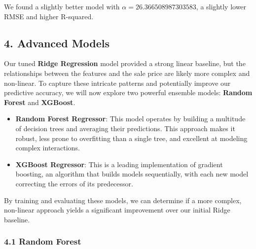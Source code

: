 \documentclass[11pt]{article}
\begin{document}
    We found a slightly better model with \(\alpha=26.366508987303583\), a
slightly lower RMSE and higher R-squared.

    \subsection{4. Advanced Models}\label{advanced-models}

    Our tuned \textbf{Ridge Regression} model provided a strong linear
baseline, but the relationships between the features and the sale price
are likely more complex and non-linear. To capture these intricate
patterns and potentially improve our predictive accuracy, we will now
explore two powerful ensemble models: \textbf{Random Forest} and
\textbf{XGBoost}.

\begin{itemize}
\item
  \textbf{Random Forest Regressor}: This model operates by building a
  multitude of decision trees and averaging their predictions. This
  approach makes it robust, less prone to overfitting than a single
  tree, and excellent at modeling complex interactions.
\item
  \textbf{XGBoost Regressor}: This is a leading implementation of
  gradient boosting, an algorithm that builds models sequentially, with
  each new model correcting the errors of its predecessor.
\end{itemize}

By training and evaluating these models, we can determine if a more
complex, non-linear approach yields a significant improvement over our
initial Ridge baseline.

    \subsubsection{4.1 Random Forest}\label{random-forest}
\end{document}
